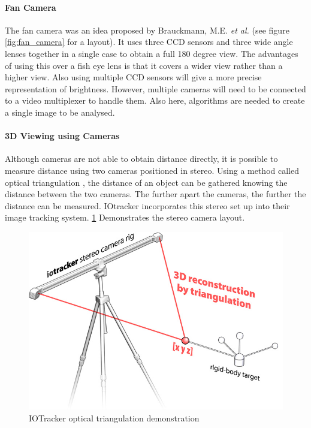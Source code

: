 \documentclass[a4paper]{report}
\begin{document}
\paragraph{Fan Camera}The fan camera was an idea proposed by Brauckmann, M.E. \textit{et al.} \citep{towards_all_around_sensing} (see figure \ref{fig:fan_camera} for a layout). It uses three CCD sensors and three wide angle lenses together in a single case to obtain a full 180 degree view. The advantages of using this over a fish eye lens is that it covers a wider view rather than a higher view. Also using multiple CCD sensors will give a more precise representation of brightness. However, multiple cameras will need to be connected to a video multiplexer to handle them. Also here, algorithms are needed to create a single image to be analysed.

\paragraph{3D Viewing using Cameras}Although cameras are not able to obtain distance directly, it is possible to measure distance using two cameras positioned in stereo. Using a method called optical triangulation \citep{huang2011laser}, the distance of an object can be gathered knowing the distance between the two cameras. The further apart the cameras, the further the distance can be measured. IOtracker \citep{iotracker} incorporates this stereo set up into their image tracking system. \ref{fig:stereo_cameras} Demonstrates the stereo camera layout.

\begin{figure}[h]
\centering
\includegraphics[scale=0.6]{figures/stereoCameras}
\caption{IOTracker optical triangulation demonstration}
\label{fig:stereo_cameras}
\end{figure}
\end{document}
